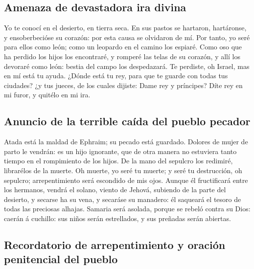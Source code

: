 \hypertarget{amenaza-de-devastadora-ira-divina}{%
\subsection{Amenaza de devastadora ira
divina}\label{amenaza-de-devastadora-ira-divina}}

 Yo te conocí en el desierto, en tierra seca. 
En sus pastos se hartaron, hartáronse, y ensoberbecióse su corazón: por
esta causa se olvidaron de mí.  Por tanto, yo seré para
ellos como león; como un leopardo en el camino los espiaré. 
Como oso que ha perdido los hijos los encontraré, y romperé las telas de
su corazón, y allí los devoraré como león: bestia del campo los
despedazará.  Te perdiste, oh Israel, mas en mí está tu
ayuda.  ¿Dónde está tu rey, para que te guarde con todas
tus ciudades? ¿y tus jueces, de los cuales dijiste: Dame rey y
príncipes?  Díte rey en mi furor, y quitélo en mi ira.

\hypertarget{anuncio-de-la-terrible-cauxedda-del-pueblo-pecador}{%
\subsection{Anuncio de la terrible caída del pueblo
pecador}\label{anuncio-de-la-terrible-cauxedda-del-pueblo-pecador}}

 Atada está la maldad de Ephraim; su pecado está guardado.
 Dolores de mujer de parto le vendrán: es un hijo
ignorante, que de otra manera no estuviera tanto tiempo en el
rompimiento de los hijos.  De la mano del sepulcro los
redimiré, librarélos de la muerte. Oh muerte, yo seré tu muerte; y seré
tu destrucción, oh sepulcro; arrepentimiento será escondido de mis ojos.
 Aunque él fructificará entre los hermanos, vendrá el
solano, viento de Jehová, subiendo de la parte del desierto, y secarse
ha su vena, y secaráse su manadero: él saqueará el tesoro de todas las
preciosas alhajas.  Samaria será asolada, porque se rebeló
contra su Dios: caerán á cuchillo: sus niños serán estrellados, y sus
preñadas serán abiertas.

\hypertarget{recordatorio-de-arrepentimiento-y-oraciuxf3n-penitencial-del-pueblo}{%
\subsection{Recordatorio de arrepentimiento y oración penitencial del
pueblo}\label{recordatorio-de-arrepentimiento-y-oraciuxf3n-penitencial-del-pueblo}}

